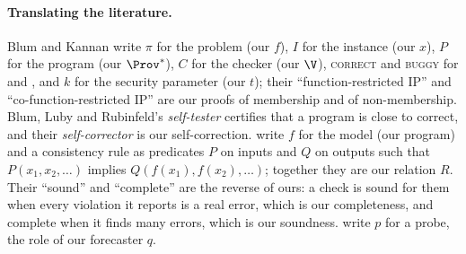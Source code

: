 \begin{refsection}
\paragraph{Translating the literature.} Blum and Kannan write $\pi$ for the problem (our $f$), $I$ for the instance (our $x$), $P$ for the program (our $\Prov^*$), $C$ for the checker (our $\V$), \textsc{correct} and \textsc{buggy} for \acc{} and \rej, and $k$ for the security parameter (our $t$); their ``function-restricted IP'' and ``co-function-restricted IP'' are our proofs of membership and of non-membership. Blum, Luby and Rubinfeld's \emph{self-tester} certifies that a program is close to correct, and their \emph{self-corrector} is our self-correction. \Textcite{FluriEtAl2024} write $f$ for the model (our program) and a consistency rule as predicates $P$ on inputs and $Q$ on outputs such that $P(x_1,x_2,\dots)$ implies $Q(f(x_1),f(x_2),\dots)$; together they are our relation $R$. Their ``sound'' and ``complete'' are the reverse of ours: a check is sound for them when every violation it reports is a real error, which is our completeness, and complete when it finds many errors, which is our soundness. \Textcite{FarquharEtAl2023} write $p$ for a probe, the role of our forecaster $q$.

\printchapterbib
\end{refsection}
